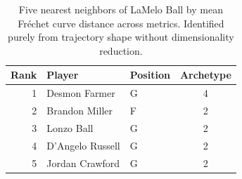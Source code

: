 \begin{table}[htbp]
  \centering\small
  \begin{tabular}{rllc}
    \toprule
    Rank & Player & Position & Archetype \\
    \midrule
    1 & Desmon Farmer & G & 4 \\
    2 & Brandon Miller & F & 2 \\
    3 & Lonzo Ball & G & 2 \\
    4 & D'Angelo Russell & G & 2 \\
    5 & Jordan Crawford & G & 2 \\
    \bottomrule
  \end{tabular}
  \caption{Five nearest neighbors of LaMelo Ball by mean Fr\'{e}chet curve distance across metrics. Identified purely from trajectory shape without dimensionality reduction.}
  \label{tab:LaMelo_Ball_frechet_curve_neighbors}
\end{table}

